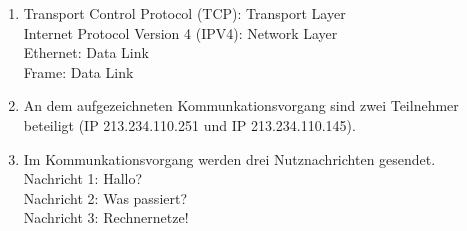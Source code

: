 \documentclass[12pt]{scrartcl}
\begin{document}
\setcounter{exnum}{1}

\begin{enumerate}[label=(\alph*)]
    \item   Transport Control Protocol (TCP): Transport Layer \\
            Internet Protocol Version 4 (IPV4): Network Layer \\
            Ethernet: Data Link \\
            Frame: Data Link 
    \item   An dem aufgezeichneten Kommunkationsvorgang sind zwei Teilnehmer\\
            beteiligt (IP 213.234.110.251 und IP 213.234.110.145). 
    \item   Im Kommunkationsvorgang werden drei Nutznachrichten gesendet. \\
            Nachricht 1: Hallo? \\
            Nachricht 2: Was passiert? \\
            Nachricht 3: Rechnernetze!
\end{enumerate}
 
\setcounter{exnum}{2}
\newcommand{\encodinggraph}[3]{
    \draw[help lines] (0,0) grid (8,2);
    \draw[very thin] (0,0) rectangle (8,2);
    \node[] at (-0.5, 0) {\small #1};
    \node[] at (-0.5, 1) {\small #2};
    \node[] at (-0.5, 2) {\small #3};
    \node[rotate=90] at (-1.25, 1) {Amplitude};
    \foreach \i/\x in {0/1,1/1,2/1,3/1,4/1,5/0,6/1,7/0}{
            \node[] at (0.5 + \i, -0.25) {\small \x};
        }
}
\newcommand{\up}{++(0,2)}
\newcommand{\down}{++(0,-2)}
\newcommand{\step}{++(1,0)}
\newcommand{\hstep}{++(0.5,0)}
\end{document}

